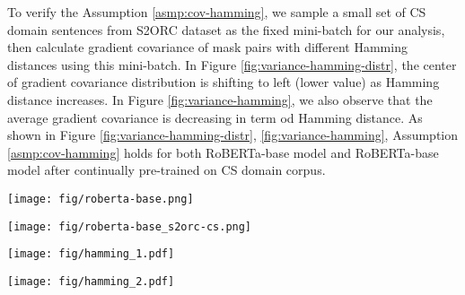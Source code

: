 \documentclass{article} \usepackage{iclr2021_conference,times}
\theoremstyle{plain}
\begin{document}
To verify the Assumption \ref{asmp:cov-hamming}, we sample a small set of CS domain sentences from S2ORC dataset \citep{gururangan2020don} as the fixed mini-batch for our analysis, then calculate gradient covariance  of mask pairs  with different Hamming distances  using this mini-batch. In Figure \ref{fig:variance-hamming-distr}, the center of gradient covariance distribution is shifting to left (lower value) as Hamming distance increases. In Figure \ref{fig:variance-hamming}, we also observe that the average gradient covariance is decreasing in term od Hamming distance. As shown in Figure \ref{fig:variance-hamming-distr}, \ref{fig:variance-hamming}, Assumption \ref{asmp:cov-hamming} holds for both RoBERTa-base model \citep{liu2019roberta} and RoBERTa-base model after continually pre-trained on CS domain corpus.

\begin{minipage}{\textwidth}
\begin{minipage}[b]{0.48\linewidth}
	\centering
	\texttt{[image: fig/roberta-base.png]} 
\vspace{-1mm}
\end{minipage}
\hfill
\begin{minipage}[b]{0.48\linewidth}
	\centering
	\texttt{[image: fig/roberta-base\_s2orc-cs.png]} 
\vspace{-1mm}
\end{minipage}
\label{fig:variance-hamming-distr}
\end{minipage}







\begin{minipage}{\textwidth}
\begin{minipage}[b]{0.48\linewidth}
	\centering
	\texttt{[image: fig/hamming\_1.pdf]} 
\vspace{-2mm}
\end{minipage}
\hfill
\begin{minipage}[b]{0.48\linewidth}
	\centering
	\texttt{[image: fig/hamming\_2.pdf]} 
\vspace{-2mm}
\end{minipage}
\label{fig:variance-hamming}
\end{minipage}
\end{document}
